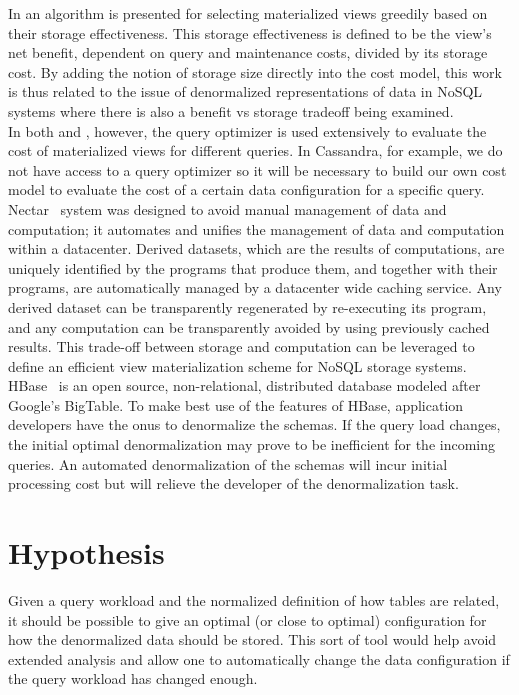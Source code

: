 \documentclass[10pt]{article}
\begin{document}
\noindent In \cite{chan99design} an algorithm is presented for selecting materialized views greedily based on their storage effectiveness.  This
storage effectiveness is defined to be the view's net benefit, dependent on query and maintenance costs, divided by its storage cost.  By
adding the notion of storage size directly into the cost model, this work is thus related to the issue of denormalized representations of
data in NoSQL systems where there is also a benefit vs storage tradeoff being examined.\\

\noindent In both \cite{agrawal2000automated} and \cite{chan99design}, however, the query optimizer is used extensively to evaluate the cost of materialized views for different queries.
In Cassandra, for example, we do not have access to a query optimizer so it will be necessary to build our own cost model to evaluate the cost
of a certain data configuration for a specific query. \\

\noindent Nectar~\cite{gunda2010nectar} system was designed to avoid manual management of data and computation; it automates and unifies the management of
data and computation within a datacenter. Derived datasets, which are the results of computations, are uniquely identified by the programs that produce them,
and together with their programs, are automatically managed by a datacenter wide caching service. Any derived dataset can be transparently regenerated by re-executing
its program, and any computation can be transparently avoided by using previously cached results. This trade-off between storage and computation can
be leveraged to define an efficient view materialization scheme for NoSQL storage systems.\\

\noindent HBase~\cite{hbaseBook} is an open source, non-relational, distributed database modeled after Google's BigTable. To make best use of the features
of HBase, application developers have the onus to denormalize the schemas. If the query load changes, the initial optimal denormalization may
prove to be inefficient for the incoming queries. An automated denormalization of the schemas will incur initial processing cost but will relieve
the developer of the denormalization task.

\section{Hypothesis}
Given a query workload and the normalized definition of how tables are related, it should be possible to give an optimal (or close to optimal) configuration 
for how the denormalized data should be stored. This sort of tool would help avoid extended analysis and allow one to automatically
change the data configuration if the query workload has changed enough.
\end{document}

